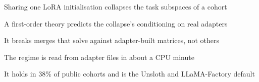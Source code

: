 \item Sharing one LoRA initialisation collapses the task subspaces of a cohort
\item A first-order theory predicts the collapse's conditioning on real adapters
\item It breaks merges that solve against adapter-built matrices, not others
\item The regime is read from adapter files in about a CPU minute
\item It holds in 38\% of public cohorts and is the Unsloth and LLaMA-Factory default

